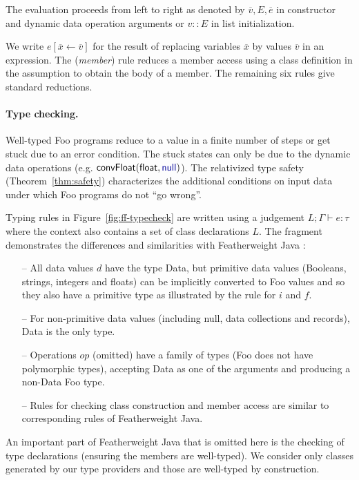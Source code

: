 \documentclass[10pt,preprint,blind,clearpagebib]{sigplanconf}
\newcommand{\kvd}[1]{\textnormal{\textcolor{kvdclr}{\sffamily #1}}}
\newcommand{\ident}[1]{\textnormal{\sffamily #1}}
\begin{document}
\noindent
The evaluation proceeds from left to right as denoted by $\overline{v}, E, \overline{e}$ in 
constructor and dynamic data operation arguments or $v::E$ in list initialization.

We write $e[\overline{x} \leftarrow \overline{v}]$ for the result of replacing variables $\overline{x}$ by
values $\overline{v}$ in an expression. The (\emph{member}) rule reduces a member access using a class 
definition in the assumption to obtain the body of a member. The remaining six rules
give standard reductions.


\paragraph{Type checking.} 
Well-typed Foo programs reduce to a value in a finite number of steps or get stuck due to an
error condition. The stuck states can only be due to the dynamic data operations (e.g.
$\ident{convFloat}(\ident{float},\kvd{null})$). The relativized type safety (Theorem~\ref{thm:safety})
characterizes the additional conditions on input data under which Foo programs do not ``go wrong''.

Typing rules in Figure~\ref{fig:ff-typecheck} are written using a judgement
$L; \Gamma \vdash e : \tau$ where the context also contains a set of class declarations $L$.
The fragment demonstrates the differences and similarities with Featherweight Java \cite{fwjava}:
%
\begin{itemize}
\item[--] All data values $d$ have the type \ident{Data}, but primitive data values (Booleans, 
  strings, integers and floats) can be implicitly converted to Foo values and so they also have a 
  primitive type as illustrated by the rule for $i$ and $f$.
\item[--] For non-primitive data values (including \kvd{null}, data collections and records),
  \ident{Data} is the only type.
\item[--] Operations $op$ (omitted) have a family of types (Foo does not have polymorphic types),
  accepting \ident{Data} as one of the arguments and producing a non-\ident{Data} Foo type.
\item[--] Rules for checking class construction and member access are similar to corresponding
  rules of Featherweight Java.  
\end{itemize}
%
An important part of Featherweight Java that is omitted here is the checking of type declarations
(ensuring the members are well-typed). We consider only classes generated by our type providers 
and those are well-typed by construction.
\end{document}
